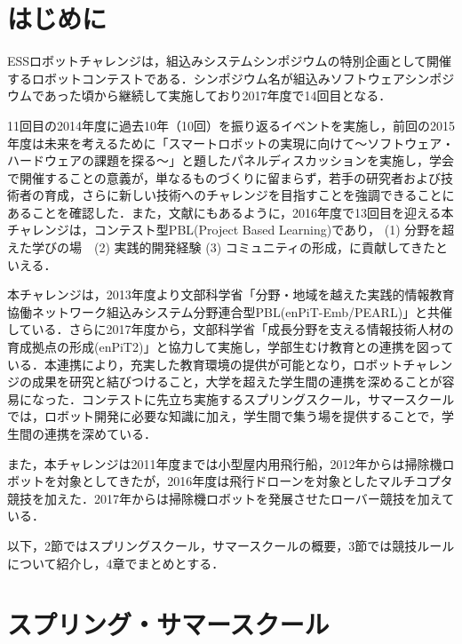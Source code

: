 \documentclass[submit]{ipsj}
\begin{document}
\maketitle

\section{はじめに}

ESSロボットチャレンジは，組込みシステムシンポジウムの特別企画として開催するロボットコンテストである．シンポジウム名が組込みソフトウェアシンポジウムであった頃から継続して実施しており2017年度で14回目となる．

11回目の2014年度に過去10年（10回）を振り返るイベントを実施し\cite{essrc2014}，前回の2015年度は未来を考えるために「スマートロボットの実現に向けて〜ソフトウェア・ハードウェアの課題を探る〜」と題したパネルディスカッションを実施し，学会で開催することの意義が，単なるものづくりに留まらず，若手の研究者および技術者の育成，さらに新しい技術へのチャレンジを目指すことを強調できることにあることを確認した\cite{essrc2015}．また，文献\cite{watanabe2016pbl}にもあるように，2016年度で13回目を迎える本チャレンジは，コンテスト型PBL(Project Based Learning)であり， (1) 分野を超えた学びの場　(2) 実践的開発経験 (3) コミュニティの形成，に貢献してきたといえる．

本チャレンジは，2013年度より文部科学省「分野・地域を越えた実践的情報教育協働ネットワーク組込みシステム分野連合型PBL(enPiT-Emb/PEARL)」と共催している\cite{enpitweb}\cite{essrcweb}．さらに2017年度から，文部科学省「成長分野を支える情報技術人材の育成拠点の形成(enPiT2)」と協力して実施し，学部生むけ教育との連携を図っている．本連携により，充実した教育環境の提供が可能となり，ロボットチャレンジの成果を研究と結びつけること，大学を超えた学生間の連携を深めることが容易になった．コンテストに先立ち実施するスプリングスクール，サマースクールでは，ロボット開発に必要な知識に加え，学生間で集う場を提供することで，学生間の連携を深めている．

また，本チャレンジは2011年度までは小型屋内用飛行船，2012年からは掃除機ロボットを対象としてきたが，2016年度は飛行ドローンを対象としたマルチコプタ競技を加えた．2017年からは掃除機ロボットを発展させたローバー競技を加えている．

以下，2節ではスプリングスクール，サマースクールの概要，3節では競技ルールについて紹介し，4章でまとめとする．


\section{スプリング・サマースクール}
\end{document}
